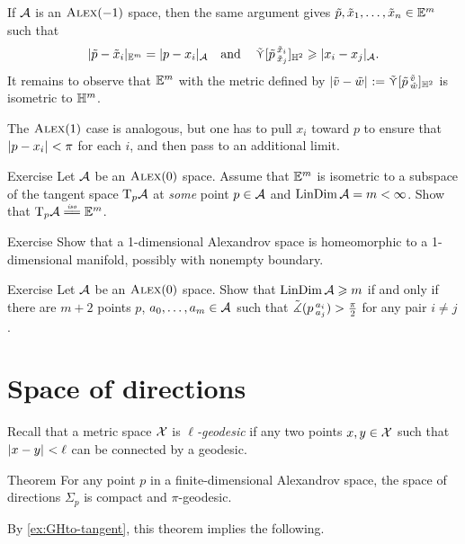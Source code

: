 If $\mathcal{A}$ is an $\textup{\textsc{Alex}}(-1)$ space, then the same argument gives
$\tilde p,\tilde x_1,\z\dots,\tilde x_n\in \EE^m$ such that
\[|\tilde p-\tilde x_i|_{\mathbb{E}^m}=| p- x_i|_{\mathcal{A}}
\quad\text{and}\quad
\mathop{\tilde\curlyvee}\nolimits[\tilde p\,{}^{\tilde x_i}_{\tilde x_j}]_{\mathbb{H}^2}\geqslant |x_i- x_j|_{\mathcal{A}}.\]
It remains to observe that $\mathbb{E}^m$ with the metric defined by
$\dist{\tilde v}{\tilde w}{}\z\df \side\hinge{\tilde p}{\tilde v}{\tilde w}_{\HH^2}$
is isometric to $\mathbb{H}^m$.

The $\textup{\textsc{Alex}}(1)$ case is analogous, but one has to pull $x_i$ toward $p$
to ensure that $\dist{p}{x_i}{}<\pi$ for each $i$, and then pass to an additional limit.
\qeds

\begin{thm}[!]{Exercise}\label{ex:dim-max}
Let $\mathcal{A}$ be an $\textup{\textsc{Alex}}(0)$ space.
Assume that $\mathbb{E}^m$ is isometric to a subspace of the tangent space $\mathrm{T}_p\mathcal{A}$ at \textit{some} point $p\in \mathcal{A}$ and $\LinDim \spc{A}\z= m<\infty$.
Show that $\T_p\spc{A}\iso \EE^m$.
\end{thm}


\begin{thm}[!]{Exercise}\label{ex:dim=1}
Show that a 1-dimensional Alexandrov space is homeomorphic to a 1-dimensional manifold, possibly with nonempty boundary.
\end{thm}


\begin{thm}{Exercise}\label{ex:resporka}
Let $\mathcal{A}$ be an $\textup{\textsc{Alex}}(0)$ space.
Show that $\LinDim \spc{A}\z\ge m$ if and only if there are $m+2$ points $p$, $a_0,\z\dots, a_{m}\in \spc{A}$
such that $\tilde\measuredangle(p\,{}^{a_i}_{a_j})>\tfrac\pi2$ for any pair $i\ne j$.
\end{thm}

\section{Space of directions}

Recall that a metric space $\mathcal{X}$ is \emph{$\ell$-geodesic}
if any two points $x,y\in\mathcal{X}$ such that $\dist{x}{y}{}<\ell$ can be connected by a geodesic.

\begin{thm}{Theorem}\label{thm:finite-space-of-directions}
For any point $p$ in a finite-dimensional Alexandrov space, the space of directions $\Sigma_p$ is compact and $\pi$-geodesic.
\end{thm}

By \ref{ex:GHto-tangent}, this theorem implies the following.

